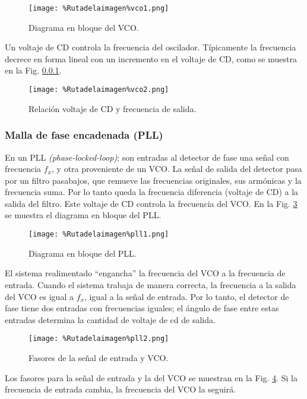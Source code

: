\documentclass{article}
\begin{document}
\begin{figure}[htbp]
    \centering
    \texttt{[image: \%Rutadelaimagen\%vco1.png]}
    \caption{Diagrama en bloque del VCO.}
    \label{vco1}
\end{figure}

Un voltaje de CD controla la frecuencia del oscilador. Típicamente la frecuencia decrece en forma lineal con un incremento en el voltaje de CD, como se muestra en la Fig. \ref{}.

\begin{figure}[htbp]
    \centering
    \texttt{[image: \%Rutadelaimagen\%vco2.png]}
    \caption{Relación voltaje de CD y frecuencia de salida.}
    \label{vco2}
\end{figure}

\subsubsection{Malla de fase encadenada (PLL)}
En un PLL \emph{(phase-locked-loop)}; son entradas al detector de fase una señal con frecuencia $f_x$, y otra proveniente de un VCO. La señal de salida del detector pasa por un filtro pasabajos, que remueve las frecuencias originales, sus armónicas y la frecuencia suma. Por lo tanto queda la frecuencia diferencia (voltaje de CD) a la salida del filtro. Este voltaje de CD controla la frecuencia del VCO. En la Fig. \ref{pll1} se muestra el diagrama en bloque del PLL.

\begin{figure}[htbp]
    \centering
    \texttt{[image: \%Rutadelaimagen\%pll1.png]}
    \caption{Diagrama en bloque del PLL.}
    \label{pll1}
\end{figure}
El sistema realimentado “engancha” la frecuencia del VCO a la frecuencia de entrada. Cuando el sistema trabaja de manera correcta, la frecuencia a la salida del VCO es igual a $f_x$, igual a la señal de entrada. Por lo tanto, el 
detector de fase tiene dos entradas con frecuencias iguales; el ángulo de fase entre estas entradas determina la cantidad de voltaje de cd de salida. 

\begin{figure}[htbp]
    \centering
    \texttt{[image: \%Rutadelaimagen\%pll2.png]}
    \caption{Fasores de la señal de entrada y VCO.}
    \label{pll2}
\end{figure}

Los fasores para la señal de entrada y la del VCO se muestran en la Fig. \ref{pll2}. Si la frecuencia de entrada cambia, la frecuencia del VCO la seguirá. 
\end{document}
